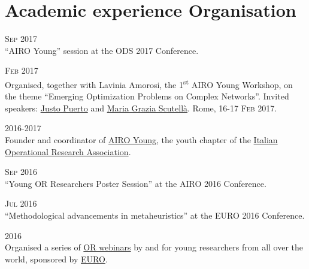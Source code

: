 \section*{Academic experience {\small Organisation}}

\begin{paracol}{2}
  \textsc{Sep 2017}
\switchcolumn
  \\
  ``AIRO Young'' session at the ODS 2017 Conference.
\end{paracol}

\begin{paracol}{2}
  \textsc{Feb 2017}
\switchcolumn
  \\
    Organised, together with Lavinia Amorosi, the 1\textsuperscript{st} AIRO Young Workshop, on the theme ``Emerging Optimization Problems on Complex Networks''. Invited speakers: \href{http://scholar.google.com/citations?user=koF66usAAAAJ}{Justo Puerto} and \href{http://scholar.google.com/citations?user=PcGjfV8AAAAJ}{Maria Grazia Scutellà}. Rome, \textsc{16-17 Feb 2017}.
\end{paracol}

\begin{paracol}{2}
  \textsc{2016-2017}
\switchcolumn
  \\
  Founder and coordinator of \href{http://airoyoung.org}{AIRO Young}, the youth chapter of the \href{http://www.airo.org}{Italian Operational Research Association}.
\end{paracol}

\begin{paracol}{2}
  \textsc{Sep 2016}
\switchcolumn
  \\
  ``Young OR Researchers Poster Session'' at the AIRO 2016 Conference.
\end{paracol}

\begin{paracol}{2}
  \textsc{Jul 2016}
\switchcolumn
  \\
  ``Methodological advancements in metaheuristics'' at the EURO 2016 Conference.
\end{paracol}

\begin{paracol}{2}
    \textsc{2016}
\switchcolumn
  \\
  Organised a series of \href{http://santini.in/seminars}{OR webinars} by and for young researchers from all over the world, sponsored by \href{http://euro-online.org}{EURO}.
\end{paracol}

